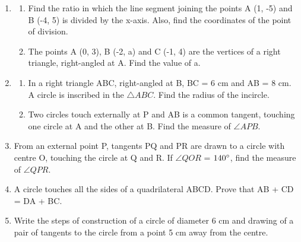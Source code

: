 \documentclass{article}
\begin{document}
\begin{enumerate}
		\item
		\begin{enumerate}
			\item Find the ratio in which the line segment joining the points A (1, -5) and B (-4, 5) is divided by the x-axis. Also, find the coordinates of the point of division.
   
			\item The points A (0, 3), B (-2, a) and C (-1, 4) are the vertices of a right triangle, right-angled at A. Find the value of a. 
		\end{enumerate}
		
		\item
		\begin{enumerate}
			\item In a right triangle ABC, right-angled at B, BC = 6 cm and AB = 8 cm. A circle is inscribed in the $\triangle ABC$. Find the radius of the incircle. 
			
			\item Two circles touch externally at P and AB is a common tangent, touching one circle at A and the other at B. Find the measure of $\angle APB$.
		\end{enumerate}
		
		\item From an external point P, tangents PQ and PR are drawn to a circle with centre O, touching the circle at Q and R. If $\angle QOR$ = $140\degree$, find the measure of $\angle QPR$. 
		
		\item A circle touches all the sides of a quadrilateral ABCD. Prove that AB + CD = DA + BC.
		
		\item Write the steps of construction of a circle of diameter 6 cm and drawing of a pair of tangents to the circle from a point 5 cm away from the centre. 
		
	\end{enumerate}	
\end{document}
